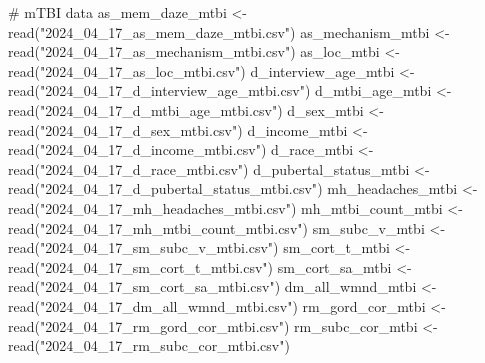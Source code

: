 \documentclass[
  letterpaper,
  DIV=11,
  numbers=noendperiod]{scrreprt}
\newenvironment{Shaded}{\begin{snugshade}}{\end{snugshade}}
\newcommand{\CommentTok}[1]{\textcolor[rgb]{0.37,0.37,0.37}{#1}}
\newcommand{\FunctionTok}[1]{\textcolor[rgb]{0.28,0.35,0.67}{#1}}
\newcommand{\NormalTok}[1]{\textcolor[rgb]{0.00,0.23,0.31}{#1}}
\newcommand{\OtherTok}[1]{\textcolor[rgb]{0.00,0.23,0.31}{#1}}
\newcommand{\StringTok}[1]{\textcolor[rgb]{0.13,0.47,0.30}{#1}}
\begin{document}
\begin{Shaded}
\begin{Highlighting}[]
\CommentTok{\# mTBI data}
\NormalTok{as\_mem\_daze\_mtbi }\OtherTok{\textless{}{-}} \FunctionTok{read}\NormalTok{(}\StringTok{"2024\_04\_17\_as\_mem\_daze\_mtbi.csv"}\NormalTok{)}
\NormalTok{as\_mechanism\_mtbi }\OtherTok{\textless{}{-}} \FunctionTok{read}\NormalTok{(}\StringTok{"2024\_04\_17\_as\_mechanism\_mtbi.csv"}\NormalTok{)}
\NormalTok{as\_loc\_mtbi }\OtherTok{\textless{}{-}} \FunctionTok{read}\NormalTok{(}\StringTok{"2024\_04\_17\_as\_loc\_mtbi.csv"}\NormalTok{)}
\NormalTok{d\_interview\_age\_mtbi }\OtherTok{\textless{}{-}} \FunctionTok{read}\NormalTok{(}\StringTok{"2024\_04\_17\_d\_interview\_age\_mtbi.csv"}\NormalTok{)}
\NormalTok{d\_mtbi\_age\_mtbi }\OtherTok{\textless{}{-}} \FunctionTok{read}\NormalTok{(}\StringTok{"2024\_04\_17\_d\_mtbi\_age\_mtbi.csv"}\NormalTok{)}
\NormalTok{d\_sex\_mtbi }\OtherTok{\textless{}{-}} \FunctionTok{read}\NormalTok{(}\StringTok{"2024\_04\_17\_d\_sex\_mtbi.csv"}\NormalTok{)}
\NormalTok{d\_income\_mtbi }\OtherTok{\textless{}{-}} \FunctionTok{read}\NormalTok{(}\StringTok{"2024\_04\_17\_d\_income\_mtbi.csv"}\NormalTok{)}
\NormalTok{d\_race\_mtbi }\OtherTok{\textless{}{-}} \FunctionTok{read}\NormalTok{(}\StringTok{"2024\_04\_17\_d\_race\_mtbi.csv"}\NormalTok{)}
\NormalTok{d\_pubertal\_status\_mtbi }\OtherTok{\textless{}{-}} \FunctionTok{read}\NormalTok{(}\StringTok{"2024\_04\_17\_d\_pubertal\_status\_mtbi.csv"}\NormalTok{)}
\NormalTok{mh\_headaches\_mtbi }\OtherTok{\textless{}{-}} \FunctionTok{read}\NormalTok{(}\StringTok{"2024\_04\_17\_mh\_headaches\_mtbi.csv"}\NormalTok{)}
\NormalTok{mh\_mtbi\_count\_mtbi }\OtherTok{\textless{}{-}} \FunctionTok{read}\NormalTok{(}\StringTok{"2024\_04\_17\_mh\_mtbi\_count\_mtbi.csv"}\NormalTok{)}
\NormalTok{sm\_subc\_v\_mtbi }\OtherTok{\textless{}{-}} \FunctionTok{read}\NormalTok{(}\StringTok{"2024\_04\_17\_sm\_subc\_v\_mtbi.csv"}\NormalTok{)}
\NormalTok{sm\_cort\_t\_mtbi }\OtherTok{\textless{}{-}} \FunctionTok{read}\NormalTok{(}\StringTok{"2024\_04\_17\_sm\_cort\_t\_mtbi.csv"}\NormalTok{)}
\NormalTok{sm\_cort\_sa\_mtbi }\OtherTok{\textless{}{-}} \FunctionTok{read}\NormalTok{(}\StringTok{"2024\_04\_17\_sm\_cort\_sa\_mtbi.csv"}\NormalTok{)}
\NormalTok{dm\_all\_wmnd\_mtbi }\OtherTok{\textless{}{-}} \FunctionTok{read}\NormalTok{(}\StringTok{"2024\_04\_17\_dm\_all\_wmnd\_mtbi.csv"}\NormalTok{)}
\NormalTok{rm\_gord\_cor\_mtbi }\OtherTok{\textless{}{-}} \FunctionTok{read}\NormalTok{(}\StringTok{"2024\_04\_17\_rm\_gord\_cor\_mtbi.csv"}\NormalTok{)}
\NormalTok{rm\_subc\_cor\_mtbi }\OtherTok{\textless{}{-}} \FunctionTok{read}\NormalTok{(}\StringTok{"2024\_04\_17\_rm\_subc\_cor\_mtbi.csv"}\NormalTok{)}

\end{Highlighting}
\end{Shaded}
\end{document}
